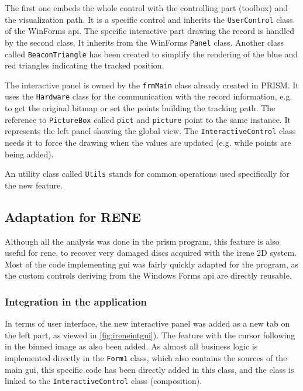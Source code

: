 The first one embeds the whole control with the controlling part (toolbox) and the visualization path. It is a specific control and inherits the \texttt{UserControl} class of the WinForms \gls{api}. The specific interactive part drawing the record is handled by the second class. It inherits from the WinForms \texttt{Panel} class. Another class called \texttt{BeaconTriangle} has been created to simplify the rendering of the blue and red triangles indicating the tracked position.

The interactive panel is owned by the \texttt{frmMain} class already created in PRISM. It uses the \texttt{Hardware} class for the communication with the record information, e.g. to get the original bitmap or set the points building the tracking path. The reference to \texttt{PictureBox} called \texttt{pict} and \texttt{picture} point to the same instance. It represents the left panel showing the global view. The \texttt{InteractiveControl} class needs it to force the drawing when the values are updated (e.g. while points are being added).

An utility class called \texttt{Utils} stands for common operations used specifically for the new feature.

\subsection{Adaptation for RENE}

Although all the analysis was done in the \gls{prism} program, this feature is also useful for \gls{rene}, to recover very damaged discs acquired with the \gls{irene} 2D system. Most of the code implementing \gls{gui} was fairly quickly adapted for the program, as the custom controls deriving from the Windows Forms \gls{api} are directly reusable.

\subsubsection{Integration in the application}

In terms of user interface, the new interactive panel was added as a new tab on the left part, as viewed in \autoref{fig:ireneintgui}). The feature with the cursor following in the binned image as also been added. As almost all business logic is implemented directly in the \texttt{Form1} class, which also contains the sources of the main \gls{gui}, this specific code has been directly added in this class, and the class is linked to the \texttt{InteractiveControl} class (composition).

